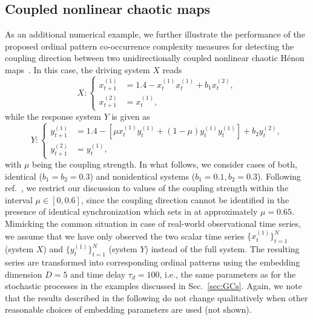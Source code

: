 \documentclass[12pt,aip,cha,reprint,nofootinbib]{revtex4-1}
\begin{document}
\subsection{Coupled nonlinear chaotic maps} \label{sec:henon}

As an additional numerical example, we further illustrate the performance of the proposed ordinal pattern co-occurrence complexity measures for detecting the coupling direction between two unidirectionally coupled nonlinear chaotic H\'enon maps~\cite{RomanoPRE2007}. In this case, the driving system $X$ reads 
\begin{equation} \label{eq:HX}
X: \left \{ \begin{aligned}
x_{t + 1}^{(1)} &= 1.4 - x^{(1)}_t x^{(1)}_t + b_1 x^{(2)}_t, \\
x_{t + 1}^{(2)} &= x_{t}^{(1)},
\end{aligned}
\right.
\end{equation}
while the response system $Y$ is given as 
\begin{equation} \label{eq:HY}
Y: \left \{ \begin{aligned}
y^{(1)}_{t + 1} &= 1.4 - [\mu x^{(1)}_t y^{(1)}_t+ (1 - \mu) y^{(1)}_t y^{(1)}_t] + b_2 y^{(2)}_t, \\
y^{(2)}_{t + 1} &= y^{(1)}_t,
\end{aligned}
\right.
\end{equation}
with $\mu$ being the coupling strength. In what follows, we consider cases of both, identical ($b_1 = b_2 = 0.3$) and nonidentical systems ($b_1 = 0.1, b_2 = 0.3$). Following ref.~\cite{RomanoPRE2007}, we restrict our discussion to values of the coupling strength within the interval $\mu \in [0, 0.6]$, since the coupling direction cannot be identified in the presence of identical synchronization which sets in at approximately $\mu = 0.65$. Mimicking the common situation in case of real-world observational time series, we assume that we have only observed the two scalar time series $\{ x^{(1)}_t \}_{t=1}^{N}$ (system $X$) and $\{ y^{(1)}_t  \}_{t=1}^{N}$ (system $Y$) instead of the full system. The resulting series are transformed into corresponding ordinal patterns using the embedding dimension $D = 5$ and time delay $\tau_d = 100$, i.e., the same parameters as for the stochastic processes in the examples discussed in Sec.~\ref{sec:GCs}. Again, we note that the results described in the following do not change qualitatively when other reasonable choices of embedding parameters are used (not shown). 
\end{document}
